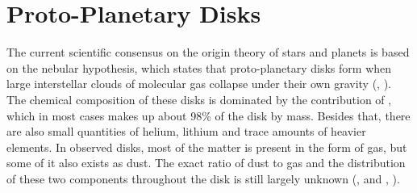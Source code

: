   \section{Proto-Planetary Disks}
    The current scientific consensus on the origin theory of stars and planets 
    is based on the nebular hypothesis, which states that proto-planetary disks 
    form when large interstellar clouds of molecular gas collapse under 
    their own gravity (\citeauthor{Woolfson_1993}, \citeyear{Woolfson_1993}).
    The chemical composition of these disks is dominated by the contribution of 
    , which in most cases makes up about 98\% of the disk by 
    mass. Besides that, there are also small quantities of helium, lithium and 
    trace amounts of heavier elements. In observed disks, most of the matter is 
    present in the form of gas, but some of it also exists as dust.
    The exact ratio of dust to gas and the distribution of these two components 
    throughout the disk is still largely unknown (\citeauthor{Birnstiel_2010}, 
    \citeyear{Birnstiel_2010} and \citeauthor{Soon_2019}, \citeyear{Soon_2019}).
